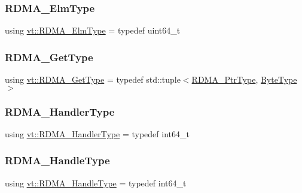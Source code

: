 \subsubsection{\texorpdfstring{R\+D\+M\+A\+\_\+\+Elm\+Type}{RDMA\_ElmType}}
{\footnotesize\ttfamily using \hyperlink{namespacevt_a2c2a902092b72056f70210c159f966f0}{vt\+::\+R\+D\+M\+A\+\_\+\+Elm\+Type} = typedef uint64\+\_\+t}

\mbox{\label{namespacevt_a1cab7f4860f65a49ad2c042d6240f288}} 
\subsubsection{\texorpdfstring{R\+D\+M\+A\+\_\+\+Get\+Type}{RDMA\_GetType}}
{\footnotesize\ttfamily using \hyperlink{namespacevt_a1cab7f4860f65a49ad2c042d6240f288}{vt\+::\+R\+D\+M\+A\+\_\+\+Get\+Type} = typedef std\+::tuple$<$\hyperlink{namespacevt_a9e2c953286c7616f7c218e9951790776}{R\+D\+M\+A\+\_\+\+Ptr\+Type}, \hyperlink{namespacevt_aab8d55968084610ce3b17057981e9300}{Byte\+Type}$>$}

\mbox{\label{namespacevt_a9530efb893c0f3846e8ac5f0507e0f49}} 
\subsubsection{\texorpdfstring{R\+D\+M\+A\+\_\+\+Handler\+Type}{RDMA\_HandlerType}}
{\footnotesize\ttfamily using \hyperlink{namespacevt_a9530efb893c0f3846e8ac5f0507e0f49}{vt\+::\+R\+D\+M\+A\+\_\+\+Handler\+Type} = typedef int64\+\_\+t}

\mbox{\label{namespacevt_a10442579ec4e7ebef223818e64bcf908}} 
\subsubsection{\texorpdfstring{R\+D\+M\+A\+\_\+\+Handle\+Type}{RDMA\_HandleType}}
{\footnotesize\ttfamily using \hyperlink{namespacevt_a10442579ec4e7ebef223818e64bcf908}{vt\+::\+R\+D\+M\+A\+\_\+\+Handle\+Type} = typedef int64\+\_\+t}

